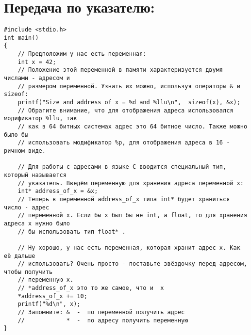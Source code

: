 \documentclass{article}
\begin{document}
\newpage
\section*{Передача по указателю:}
\begin{lstlisting}
#include <stdio.h>
int main() 
{ 
    // Предположим у нас есть переменная:
    int x = 42; 
    // Положение этой переменной в памяти характеризуется двумя числами - адресом и 
    // размером переменной. Узнать их можно, используя операторы & и sizeof:
    printf("Size and address of x = %d and %llu\n",  sizeof(x), &x);
    // Обратите внимание, что для отображения адреса использовался модификатор %llu, так 
    // как в 64 битных системах адрес это 64 битное число. Также можно было бы 
    // использовать модификатор %p, для отображения адреса в 16 - ричном виде.
    
    // Для работы с адресами в языке C вводится специальный тип, который называется 
    // указатель. Введём переменную для хранения адреса переменной x:
    int* address_of_x = &x;
    // Теперь в переменной address_of_x типа int* будет храниться число - адрес 
    // переменной x. Если бы x был бы не int, а float, то для хранения адреса x нужно было 
    // бы использовать тип float* .
    
    // Ну хорошо, у нас есть переменная, которая хранит адрес x. Как её дальше 
    // использовать? Очень просто - поставьте звёздочку перед адресом, чтобы получить 
    // переменную x.
    // *address_of_x это то же самое, что и  x
    *address_of_x += 10;
    printf("%d\n", x);
    // Запомните: &  -  по переменной получить адрес
    //            *  -  по адресу получить переменную
} 
\end{lstlisting}
\end{document}
